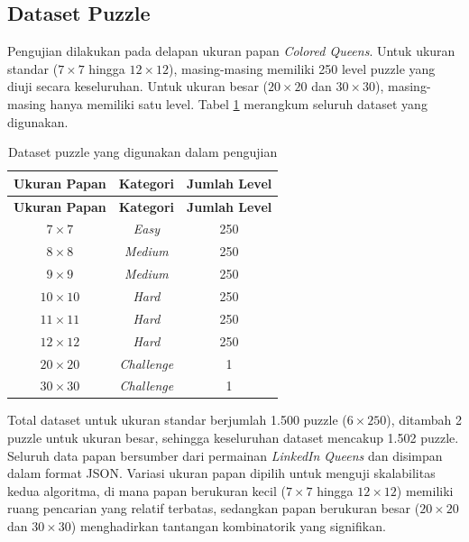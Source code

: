 \subsection{Dataset Puzzle}
\label{subsec:dataset-puzzle}

Pengujian dilakukan pada delapan ukuran papan \textit{Colored Queens}. Untuk ukuran standar ($7 \times 7$ hingga $12 \times 12$), masing-masing memiliki 250 level puzzle yang diuji secara keseluruhan. Untuk ukuran besar ($20 \times 20$ dan $30 \times 30$), masing-masing hanya memiliki satu level. Tabel \ref{tab:dataset} merangkum seluruh dataset yang digunakan.

\begin{longtable}{ccc}
	\caption{Dataset puzzle yang digunakan dalam pengujian}
	\label{tab:dataset} \\
	\toprule
	\textbf{Ukuran Papan} & \textbf{Kategori} & \textbf{Jumlah Level} \\
	\midrule
	\endfirsthead
	\toprule
	\textbf{Ukuran Papan} & \textbf{Kategori} & \textbf{Jumlah Level} \\
	\midrule
	\endhead
	\bottomrule
	\endfoot
	$7 \times 7$ & \textit{Easy} & 250 \\
	\midrule
	$8 \times 8$ & \textit{Medium} & 250 \\
	\midrule
	$9 \times 9$ & \textit{Medium} & 250 \\
	\midrule
	$10 \times 10$ & \textit{Hard} & 250 \\
	\midrule
	$11 \times 11$ & \textit{Hard} & 250 \\
	\midrule
	$12 \times 12$ & \textit{Hard} & 250 \\
	\midrule
	$20 \times 20$ & \textit{Challenge} & 1 \\
	\midrule
	$30 \times 30$ & \textit{Challenge} & 1 \\
	\bottomrule
\end{longtable}

Total dataset untuk ukuran standar berjumlah 1.500 puzzle ($6 \times 250$), ditambah 2 puzzle untuk ukuran besar, sehingga keseluruhan dataset mencakup 1.502 puzzle. Seluruh data papan bersumber dari permainan \textit{LinkedIn Queens} dan disimpan dalam format JSON. Variasi ukuran papan dipilih untuk menguji skalabilitas kedua algoritma, di mana papan berukuran kecil ($7 \times 7$ hingga $12 \times 12$) memiliki ruang pencarian yang relatif terbatas, sedangkan papan berukuran besar ($20 \times 20$ dan $30 \times 30$) menghadirkan tantangan kombinatorik yang signifikan.

